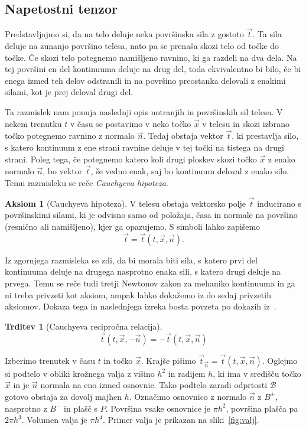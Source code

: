 \documentclass[12pt,a4paper]{article}
\theoremstyle{definition} %
\newtheorem{aksiom}{Aksiom}
\theoremstyle{plain} %
\newtheorem{trditev}[definicija]{Trditev}
\numberwithin{equation}{section}
\newcommand{\B}{\mathcal{B}}
\newcommand{\vt}{\vec{t}}
\newcommand{\vn}{\vec{n}}
\newcommand{\vx}{\vec{x}}
\begin{document}
\subsection{Napetostni tenzor}
Predstavljajmo si, da na telo deluje neka površinska sila z gostoto $\vt$. Ta sila deluje
na zunanjo površino telesa, nato pa se prenaša skozi telo od točke do točke.
Če skozi telo potegnemo namišljeno ravnino, ki ga razdeli na dva dela.
Na tej površini en del kontinuuma deluje na drug del, toda ekvivalentno bi bilo,
če bi enega izmed teh delov odstranili in na površino preostanka delovali z
enakimi silami, kot je prej deloval drugi del.

Ta razmislek nam ponuja naslednji opis notranjih in površinskih sil telesa.
V nekem trenutku $t$ v času se postavimo v neko točko $\vx$ v telesu in skozi izbrano
točko potegnemo ravnino z normalo $\vn$. Tedaj obstaja vektor $\vt$, ki
prestavlja silo, s katero kontinuum z ene strani ravnine deluje v tej točki na
tistega na drugi strani. Poleg tega, če potegnemo katero koli drugi ploskev
skozi točko $\vx$ z enako normalo $\vn$, bo vektor $\vt$, še vedno enak, saj bo
kontinuum deloval z enako silo. Temu razmisleku se reče \emph{Cauchyeva
hipoteza}.

\begin{aksiom}[Cauchyeva hipoteza]
  V telesu obstaja vektorsko polje $\vt$ inducirano s površinskimi silami, ki
  je odvisno samo od položaja, časa in normale na površino (resnično ali
  namišljeno), kjer ga opazujemo.  S simboli lahko zapišemo
  \[
    \vt = \vt(t, \vx, \vn).
  \]
\end{aksiom}

Iz zgornjega razmisleka se zdi, da bi morala biti sila, s katero prvi del
kontinuuma deluje na drugega nasprotno enaka sili, s katero drugi deluje na
prvega. Temu se reče tudi tretji Newtonov zakon za mehaniko kontinuuma in
ga ni treba privzeti kot aksiom, ampak lahko dokažemo iz do sedaj
privzetih aksiomov. Dokaza tega in naslednjega izreka bosta povzeta po dokazih
iz~\cite[str.\ 104--107]{hjelmstad2007fundamentals}.
\begin{trditev}[Cauchyeva recipročna relacija]
  \label{trd:cauchy-reciprocal}
  \begin{equation}
    \vt(t, \vx, -\vn) = -\vt(t, \vx, \vn)
    \label{eq:cauchy-reciprocal}
  \end{equation}
\end{trditev}
\proof
Izberimo trenutek v času $t$ in točko $\vx$. Krajše pišimo $\vt_{\vn} = \vt(t, \vx,
\vn)$. Oglejmo si podtelo v obliki krožnega valja z višino $h^2$ in radijem $h$, ki ima
v središču točko $\vx$ in je $\vn$ normala na eno izmed osnovnic.
Tako podtelo zaradi odprtosti $\B$ gotovo obstaja za dovolj majhen $h$. Označimo
osnovnico z normalo $\vn$ z $B^+$, nasprotno z $B^-$ in plašč s $P$. Površina
vsake osnovnice je $\pi h^2$, površina plašča pa $2 \pi h^3$. Volumen valja je
$\pi h^4$. Primer valja je prikazan na sliki~\ref{fig:valj}.
\end{document}

